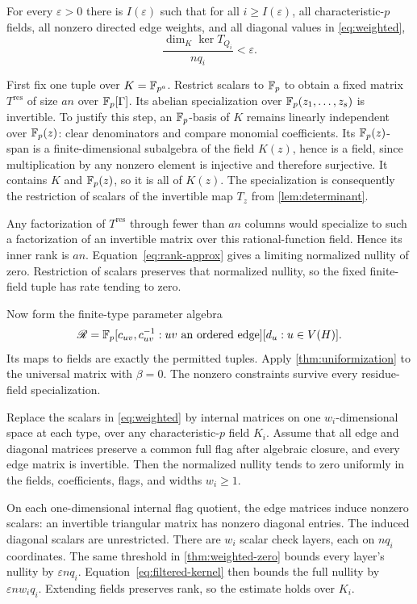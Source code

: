 \begin{theorem}\label{thm:weighted-zero}
\notformalized
For every $\varepsilon>0$ there is $I(\varepsilon)$ such that for
all $i\ge I(\varepsilon)$, all characteristic-$p$ fields, all nonzero
directed edge weights, and all diagonal values in \eqref{eq:weighted},
\[
 \frac{\dim_K\ker T_{Q_i}}{nq_i}<\varepsilon.
\]
\end{theorem}
\begin{informalproof}
First fix one tuple over $K=\mathbb{F}_{p^a}$. Restrict scalars to $\mathbb{F}_p$
to obtain a fixed matrix $T^{\mathrm{res}}$ of size $an$ over
$\mathbb{F}_p[\Gamma]$. Its abelian specialization over
$\mathbb{F}_p(z_1,\ldots,z_s)$ is invertible. To justify this step, an
$\mathbb{F}_p$-basis of $K$ remains linearly independent over $\mathbb{F}_p(z)$:
clear denominators and compare monomial coefficients. Its
$\mathbb{F}_p(z)$-span is a finite-dimensional subalgebra of the field
$K(z)$, hence is a field, since multiplication by any nonzero element
is injective and therefore surjective. It contains $K$ and
$\mathbb{F}_p(z)$, so it is all of $K(z)$. The specialization is consequently
the restriction of scalars of the invertible map $T_z$ from
\cref{lem:determinant}.

Any factorization of $T^{\mathrm{res}}$ through fewer than $an$
columns would specialize to such a factorization of an invertible
matrix over this rational-function field. Hence its inner rank is
$an$. Equation~\eqref{eq:rank-approx} gives a limiting normalized
nullity of zero. Restriction of scalars preserves that normalized
nullity, so the fixed finite-field tuple has rate tending to zero.

Now form the finite-type parameter algebra
\[
 \mathscr R=\mathbb{F}_p[c_{uv},c_{uv}^{-1}:uv\text{ an ordered edge}]
                  [d_u:u\in V(H)].
\]
Its maps to fields are exactly the permitted tuples. Apply
\cref{thm:uniformization} to the universal matrix with $\beta=0$.
The nonzero constraints survive every residue-field specialization.
\end{informalproof}

\begin{corollary}\label{cor:flag-zero}
\notformalized
Replace the scalars in \eqref{eq:weighted} by internal matrices on
one $w_i$-dimensional space at each type, over any characteristic-$p$
field $K_i$. Assume that all edge and diagonal matrices preserve a
common full flag after algebraic closure, and every edge matrix is
invertible. Then the normalized nullity tends to zero uniformly in
the fields, coefficients, flags, and widths $w_i\ge1$.
\end{corollary}
\begin{informalproof}
On each one-dimensional internal flag quotient, the edge matrices
induce nonzero scalars: an invertible triangular matrix has nonzero
diagonal entries. The induced diagonal scalars are unrestricted.
There are $w_i$ scalar check layers, each on $nq_i$ coordinates.
The same threshold in \cref{thm:weighted-zero} bounds every layer's
nullity by $\varepsilon nq_i$. Equation~\eqref{eq:filtered-kernel}
then bounds the full nullity by $\varepsilon nw_iq_i$.
Extending fields preserves rank, so the estimate holds over $K_i$.
\end{informalproof}

